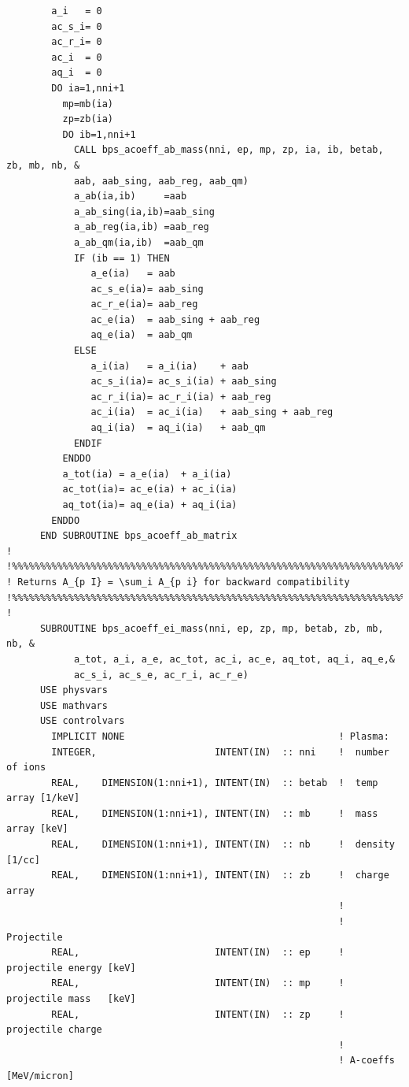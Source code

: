 \documentclass[preprint,12pt,eqsecnum,nofootinbib,amsmath,amssymb]{revtex4}
\begin{document}
{\begin{verbatim}
        a_i   = 0
        ac_s_i= 0
        ac_r_i= 0
        ac_i  = 0
        aq_i  = 0
        DO ia=1,nni+1
          mp=mb(ia)
          zp=zb(ia)
          DO ib=1,nni+1
            CALL bps_acoeff_ab_mass(nni, ep, mp, zp, ia, ib, betab, zb, mb, nb, &
            aab, aab_sing, aab_reg, aab_qm)
            a_ab(ia,ib)     =aab
            a_ab_sing(ia,ib)=aab_sing
            a_ab_reg(ia,ib) =aab_reg
            a_ab_qm(ia,ib)  =aab_qm 
            IF (ib == 1) THEN
               a_e(ia)   = aab 
               ac_s_e(ia)= aab_sing
               ac_r_e(ia)= aab_reg
               ac_e(ia)  = aab_sing + aab_reg
               aq_e(ia)  = aab_qm
            ELSE
               a_i(ia)   = a_i(ia)    + aab 
               ac_s_i(ia)= ac_s_i(ia) + aab_sing
               ac_r_i(ia)= ac_r_i(ia) + aab_reg
               ac_i(ia)  = ac_i(ia)   + aab_sing + aab_reg
               aq_i(ia)  = aq_i(ia)   + aab_qm
            ENDIF
          ENDDO
          a_tot(ia) = a_e(ia)  + a_i(ia)
          ac_tot(ia)= ac_e(ia) + ac_i(ia)
          aq_tot(ia)= aq_e(ia) + aq_i(ia)
        ENDDO
      END SUBROUTINE bps_acoeff_ab_matrix
!
!%%%%%%%%%%%%%%%%%%%%%%%%%%%%%%%%%%%%%%%%%%%%%%%%%%%%%%%%%%%%%%%%%%%%%%%%%%%%
! Returns A_{p I} = \sum_i A_{p i} for backward compatibility
!%%%%%%%%%%%%%%%%%%%%%%%%%%%%%%%%%%%%%%%%%%%%%%%%%%%%%%%%%%%%%%%%%%%%%%%%%%%%
!
      SUBROUTINE bps_acoeff_ei_mass(nni, ep, zp, mp, betab, zb, mb, nb, &
            a_tot, a_i, a_e, ac_tot, ac_i, ac_e, aq_tot, aq_i, aq_e,&
            ac_s_i, ac_s_e, ac_r_i, ac_r_e)
      USE physvars
      USE mathvars    
      USE controlvars  
        IMPLICIT NONE                                      ! Plasma:
        INTEGER,                     INTENT(IN)  :: nni    !  number of ions
        REAL,    DIMENSION(1:nni+1), INTENT(IN)  :: betab  !  temp array [1/keV]
        REAL,    DIMENSION(1:nni+1), INTENT(IN)  :: mb     !  mass array [keV]
        REAL,    DIMENSION(1:nni+1), INTENT(IN)  :: nb     !  density [1/cc]
        REAL,    DIMENSION(1:nni+1), INTENT(IN)  :: zb     !  charge array
                                                           !
                                                           ! Projectile  
        REAL,                        INTENT(IN)  :: ep     !  projectile energy [keV]
        REAL,                        INTENT(IN)  :: mp     !  projectile mass   [keV]
        REAL,                        INTENT(IN)  :: zp     !  projectile charge
                                                           !
                                                           ! A-coeffs [MeV/micron]

\end{verbatim}}
\end{document}
